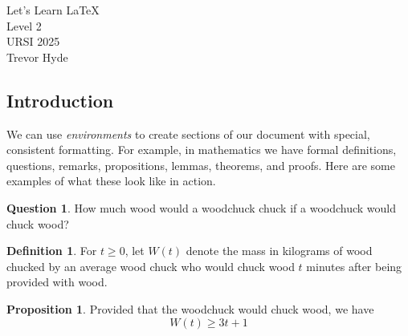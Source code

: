 \documentclass[11pt]{article}
\theoremstyle{definition}
\newtheorem{proposition}[theorem]{Proposition}
\newtheorem{definition}[theorem]{Definition}
\newtheorem{question}[theorem]{Question}
\newcommand{\head}[1]{
	\begin{center}         %
		{\large #1}        %
	\end{center}
	\bigskip               %
}
\begin{document}
 

\head{Let's Learn \LaTeX\\
Level 2\\
URSI 2025\\
Trevor Hyde
}

\subsection{Introduction}

We can use \textit{environments} to create sections of our document with special, consistent formatting.
For example, in mathematics we have formal definitions, questions, remarks, propositions, lemmas, theorems, and proofs.
Here are some examples of what these look like in action.


\begin{question}
    How much wood would a woodchuck chuck if a woodchuck would chuck wood?
\end{question}

\begin{definition}
    For $t \geq 0$, let $W(t)$ denote the mass in kilograms of wood chucked by an average wood chuck who would chuck wood $t$ minutes after being provided with wood.
\end{definition}

\begin{proposition}
    Provided that the woodchuck would chuck wood, we have
    \[
        W(t) \geq 3t + 1
    \]
\end{proposition}
\end{document}
